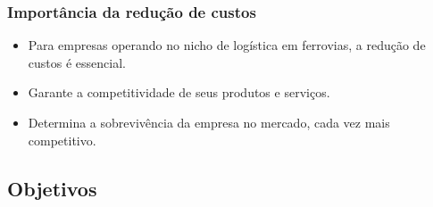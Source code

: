 \documentclass{beamer}
\begin{document}
\begin{frame}
\frametitle{Importância da redução de custos}

\begin{itemize}
	\item Para empresas operando no nicho de logística em ferrovias, a redução de custos é essencial.
	\item Garante a competitividade de seus produtos e serviços.
	\item Determina a sobrevivência da empresa no mercado, cada vez mais competitivo.
	
\end{itemize}


\end{frame}


\subsection{Objetivos}
\end{document}
